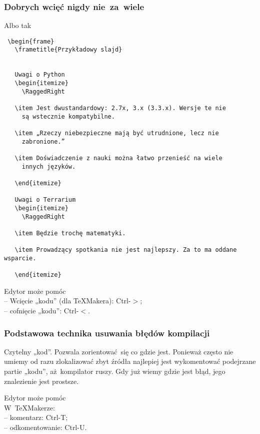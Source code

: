 \documentclass[10pt,t]{beamer}
\begin{document}
\begin{frame}[fragile]
  \frametitle{Dobrych wcięć nigdy nie~za~wiele}


  Albo tak

  \begingroup

  \tiny

\begin{verbatim}
 \begin{frame}
   \frametitle{Przykładowy slajd}


   Uwagi o Python
   \begin{itemize}
     \RaggedRight

   \item Jest dwustandardowy: 2.7x, 3.x (3.3.x). Wersje te nie
     są wstecznie kompatybilne.

   \item „Rzeczy niebezpieczne mają być utrudnione, lecz nie
     zabronione.”

   \item Doświadczenie z nauki można łatwo przenieść na wiele
     innych języków.

   \end{itemize}

   Uwagi o Terrarium
   \begin{itemize}
     \RaggedRight

   \item Będzie trochę matematyki.

   \item Prowadzący spotkania nie jest najlepszy. Za to ma oddane wsparcie.

   \end{itemize}
\end{verbatim}

\endgroup



  Edytor może pomóc \\
  -- Wcięcie „kodu” (dla \TeX Makera): Ctrl-$>$; \\
  -- cofnięcie „kodu”: Ctrl-$<$.

\end{frame}





\begin{frame}
  \frametitle{Podstawowa technika usuwania błędów kompilacji}


  Czytelny „kod”. Pozwala zorientować~się co gdzie jest. Ponieważ często
  nie umiemy od razu zlokalizować zbyt źródła najlepiej jest wykomentować
  podejrzane partie „kodu”, aż~kompilator ruszy. Gdy już wiemy gdzie jest
  błąd, jego znalezienie jest prostsze.

  Edytor może pomóc \\
  W~\TeX Makerze: \\
  -- komentarz: Ctrl-T; \\
  -- odkomentowanie: Ctrl-U.

\end{frame}
\end{document}
